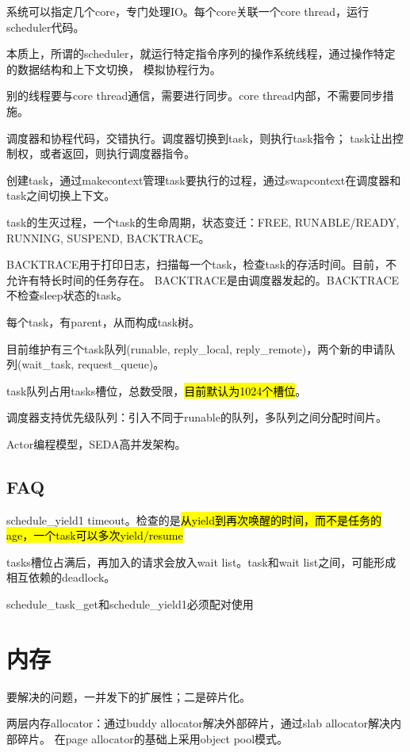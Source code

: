 系统可以指定几个core，专门处理IO。每个core关联一个core thread，运行scheduler代码。

本质上，所谓的scheduler，就运行特定指令序列的操作系统线程，通过操作特定的数据结构和上下文切换，
模拟协程行为。

别的线程要与core thread通信，需要进行同步。core thread内部，不需要同步措施。

调度器和协程代码，交错执行。调度器切换到task，则执行task指令；
task让出控制权，或者返回，则执行调度器指令。

创建task，通过makecontext管理task要执行的过程，通过swapcontext在调度器和task之间切换上下文。

task的生灭过程，一个task的生命周期，状态变迁：FREE, RUNABLE/READY, RUNNING, SUSPEND, BACKTRACE。

BACKTRACE用于打印日志，扫描每一个task，检查task的存活时间。目前，不允许有特长时间的任务存在。
BACKTRACE是由调度器发起的。BACKTRACE不检查sleep状态的task。

每个task，有parent，从而构成task树。

目前维护有三个task队列(runable, reply\_local, reply\_remote)，两个新的申请队列(wait\_task, request\_queue)。

task队列占用tasks槽位，总数受限，\hl{目前默认为1024个槽位}。

调度器支持优先级队列：引入不同于runable的队列，多队列之间分配时间片。

Actor编程模型，SEDA高并发架构。

\subsection{FAQ}

\begin{compactenum}
\item schedule\_yield1 timeout。检查的是\hl{从yield到再次唤醒的时间，而不是任务的age，一个task可以多次yield/resume}
\item tasks槽位占满后，再加入的请求会放入wait list。task和wait list之间，可能形成相互依赖的deadlock。
\item schedule\_task\_get和schedule\_yield1必须配对使用
\end{compactenum}

\section{内存}

要解决的问题，一并发下的扩展性；二是碎片化。

两层内存allocator：通过buddy allocator解决外部碎片，通过slab allocator解决内部碎片。
在page allocator的基础上采用object pool模式。

